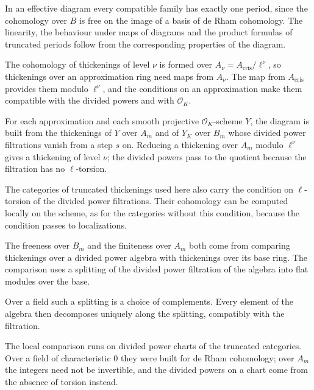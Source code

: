 In an effective diagram every compatible family has exactly one period, since the cohomology over $B$ is free on the
image of a basis of de Rham cohomology. The linearity, the behaviour under maps of diagrams and the product formulas of
truncated periods follow from the corresponding properties of the diagram.

The cohomology of thickenings of level $\nu$ is formed over $A_\nu=A_{\mathrm{cris}}/\ell^\nu$, so thickenings over an
approximation ring need maps from $A_\nu$. The map from $A_{\mathrm{cris}}$ provides them modulo $\ell^\nu$, and the
conditions on an approximation make them compatible with the divided powers and with $\mathcal O_K$.

For each approximation and each smooth projective $\mathcal O_K$-scheme $Y$, the diagram is built from the thickenings of
$Y$ over $A_m$ and of $Y_K$ over $B_m$ whose divided power filtrations vanish from a step $s$ on. Reducing a thickening
over $A_m$ modulo $\ell^\nu$ gives a thickening of level $\nu$; the divided powers pass to the quotient because the
filtration has no $\ell$-torsion.

The categories of truncated thickenings used here also carry the condition on $\ell$-torsion of the divided power
filtrations. Their cohomology can be computed locally on the scheme, as for the categories without this condition,
because the condition passes to localizations.

The freeness over $B_m$ and the finiteness over $A_m$ both come from comparing thickenings over a divided power algebra
with thickenings over its base ring. The comparison uses a splitting of the divided power filtration of the algebra into
flat modules over the base.

Over a field such a splitting is a choice of complements. Every element of the algebra then decomposes uniquely along
the splitting, compatibly with the filtration.

The local comparison runs on divided power charts of the truncated categories. Over a field of characteristic $0$ they
were built for de Rham cohomology; over $A_m$ the integers need not be invertible, and the divided powers on a chart come
from the absence of torsion instead.

